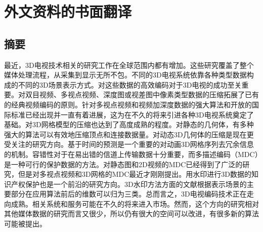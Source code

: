 %
%
%

\chapter{外文资料的书面翻译}

\section{摘要}

最近，3D电视技术相关的研究工作在全球范围内都有增加。这些研究覆盖了整个媒体处理流程，从采集到显示无所不包。不同的3D电视系统依靠各种类型数据构成的不同的3D场景表示方式。对这些数据的高效编码对于3D电视的成功至关重要。对双目视频、多视点视频、深度图或视差图中像素类型数据的压缩拓展了已有的经典视频编码的原则。针对多视点视频和视频加深度数据的强大算法和开放的国际标准已经出现并一直有着进展，这为在不久的将来引进各种3D电视系统奠定了基础。对3D网格模型的压缩也达到了高度成熟的程度。对静态的几何体，有多种强大的算法可以有效地压缩顶点和连接数据量。对动态3D几何体的压缩是现在更受关注的研究方向。基于时间的预测是一个重要的对动画3D网格序列去冗余信息的机制。容错性对于在易出错的信道上传输数据十分重要，而多描述编码（MDC）是一种可行的保护数据的方法。对静态图和2D视频的MDC已经得到了广泛的研究，但是对多视点视频和3D网格的MDC最近才刚刚提出。用水印进行3D数据的知识产权保护也是一个前沿的研究方向。3D水印方法方面的文献根据表示场景的主要部分在应用算法前后的维数可以归为三类。总而言之，3D电视编码技术正在走向成熟。相关系统和服务可能在不久的将来进入市场。然而，这个方向的研究相对其他媒体数据的研究而言又很少，所以仍有很大的空间可以改进，有很多新的算法可能被提出。

